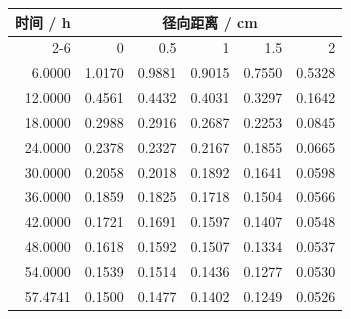 \begin{tabular}{rrrrrr}
\toprule
时间 / h & \multicolumn{5}{c}{径向距离 / cm} \\
\cmidrule(lr){2-6}
 & 0 & 0.5 & 1 & 1.5 & 2 \\
\midrule
6.0000 & 1.0170 & 0.9881 & 0.9015 & 0.7550 & 0.5328 \\
12.0000 & 0.4561 & 0.4432 & 0.4031 & 0.3297 & 0.1642 \\
18.0000 & 0.2988 & 0.2916 & 0.2687 & 0.2253 & 0.0845 \\
24.0000 & 0.2378 & 0.2327 & 0.2167 & 0.1855 & 0.0665 \\
30.0000 & 0.2058 & 0.2018 & 0.1892 & 0.1641 & 0.0598 \\
36.0000 & 0.1859 & 0.1825 & 0.1718 & 0.1504 & 0.0566 \\
42.0000 & 0.1721 & 0.1691 & 0.1597 & 0.1407 & 0.0548 \\
48.0000 & 0.1618 & 0.1592 & 0.1507 & 0.1334 & 0.0537 \\
54.0000 & 0.1539 & 0.1514 & 0.1436 & 0.1277 & 0.0530 \\
57.4741 & 0.1500 & 0.1477 & 0.1402 & 0.1249 & 0.0526 \\
\bottomrule
\end{tabular}
